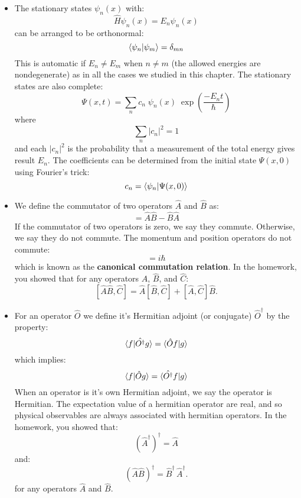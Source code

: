 \documentclass[12pt]{book}
\begin{document}
\begin{itemize}
\item The stationary states $\psi_n(x)$ with:
$$\hat{H} \psi_n(x) = E_n \psi_n(x)$$
can be arranged to be orthonormal:
\begin{equation}
\braket{\psi_n|\psi_m}=\delta_{mn}
\end{equation}
This is automatic if $E_n \neq E_m$ when $n \neq m$ (the allowed energies are nondegenerate) as in all the cases we studied in this chapter.  The stationary states are also complete:
\begin{equation}
\Psi(x,t) = \sum_n c_n \; \psi_n(x) \; \exp\left(\frac{-E_n t}{\hbar}\right)
\end{equation}
where 
$$\sum_n |c_n|^2 = 1$$
and each $|c_n|^2$ is the probability that a measurement of the total energy gives result $E_n$.  The coefficients can be determined from the initial state $\Psi(x,0)$ using Fourier's trick:
\begin{equation}
c_n = \braket{\psi_n| \Psi(x,0)}
\end{equation}
\item We define the commutator of two operators $\hat{A}$ and $\hat{B}$ as:
\begin{equation}
[\hat{A},\hat{B}]=\hat{A}\hat{B} - \hat{B}\hat{A}
\end{equation}
If the commutator of two operators is zero, we say they commute.  Otherwise, we say they do not commute.  The momentum and position operators do not commute:
\begin{equation}
[\hat{x},\hat{p}]=i\hbar
\end{equation}
which is known as the {\bf canonical commutation relation}.  In the homework, you showed that
for any operators $\hat{A}$, $\hat{B}$, and $\hat{C}$:
$$ [\hat{A}\hat{B}, \hat{C}] = \hat{A}[\hat{B}, \hat{C}] + [\hat{A}, \hat{C}]\hat{B}.$$

\item For an operator $\hat{O}$ we define it's Hermitian adjoint (or conjugate) $\hat{O}^\dagger$ by the property:
\begin{equation}
\braket{f|\hat{O^\dagger}g} = \braket{\hat{O} f| g}
\end{equation}
which implies:
\begin{equation}
\braket{f|\hat{O}g} = \braket{\hat{O^\dagger} f| g}
\end{equation}
When an operator is it's own Hermitian adjoint, we say the operator is Hermitian.  The expectation value of a hermitian operator are real, and so physical observables are always associated with hermitian operators.  In the homework, you showed that:
$$\left(\hat{A}^\dagger\right)^\dagger = \hat{A}$$
and:
$$\left(\hat{A}\hat{B}\right)^\dagger = \hat{B}^\dagger \, \hat{A}^\dagger.$$
for any operators $\hat{A}$ and $\hat{B}$.


\end{itemize}
\end{document}

